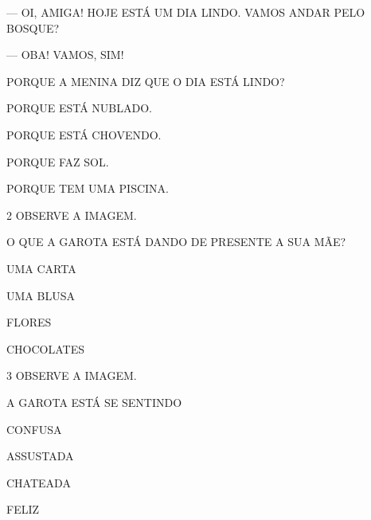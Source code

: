 — OI, AMIGA! HOJE ESTÁ UM DIA LINDO. VAMOS ANDAR PELO BOSQUE?

— OBA! VAMOS, SIM!

PORQUE A MENINA DIZ QUE O DIA ESTÁ LINDO? 

\begin{escolha}
\item PORQUE ESTÁ NUBLADO.

\item PORQUE ESTÁ CHOVENDO.

\item PORQUE FAZ SOL.

\item  PORQUE TEM UMA PISCINA.
\end{escolha}

\num{2} OBSERVE A IMAGEM.


O QUE A GAROTA ESTÁ DANDO DE PRESENTE A SUA MÃE?

\begin{escolha}
\item UMA CARTA

\item UMA BLUSA

\item FLORES

\item CHOCOLATES
\end{escolha}

\num{3} OBSERVE A IMAGEM.


A GAROTA ESTÁ SE SENTINDO

\begin{escolha}
\item CONFUSA

\item ASSUSTADA

\item CHATEADA

\item FELIZ
\end{escolha}

